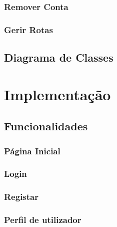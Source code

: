 \documentclass[
  oneside,
  11pt, a4paper,
  footinclude=true,
  headinclude=true,
  cleardoublepage=empty
]{scrbook}
\begin{document}
    \subsection{Remover Conta}
    
    
    \subsection{Gerir Rotas}
    
    
    \section{Diagrama de Classes}
    

\newpage
	\chapter{Implementação}
    
    \section{Funcionalidades}
    \subsection{Página Inicial}
    
    
    \newpage
    
    \subsection{Login}
    
    
    \newpage
    
    \subsection{Registar}
    
    
    \newpage
    
    \subsection{Perfil de utilizador}
    
    
    \newpage
    
\end{document}

